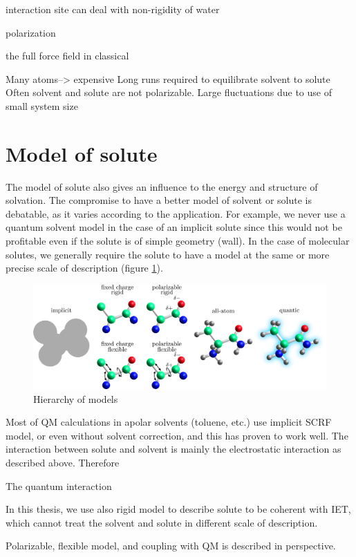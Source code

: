 interaction site can deal with non-rigidity of water

polarization

the full force field in classical

Many atoms--> expensive Long runs required to equilibrate solvent
to solute Often solvent and solute are not polarizable. Large fluctuations
due to use of small system size 


\section{Model of solute}

The model of solute also gives an influence to the energy and structure
of solvation. The compromise to have a better model of solvent or
solute is debatable, as it varies according to the application. For
example, we never use a quantum solvent model in the case of an implicit
solute since this would not be profitable even if the solute is of simple geometry
(wall). In the case of molecular solutes, we generally require the
solute to have a model at the same  or more precise scale of description
(figure \ref{fig:Hierarchy-of-models}).

\begin{flushright}
\begin{figure}[h]
\raggedleft{}%
\begin{minipage}[t]{1.1\columnwidth}%
\begin{center}
\includegraphics[width=1\columnwidth]{_figure/solute}
\par\end{center}%
\end{minipage}\caption{Hierarchy of models\label{fig:Hierarchy-of-models}}
\end{figure}

\par\end{flushright}

Most of \acs{QM} calculations in apolar solvents (toluene, etc.)
use implicit SCRF model, or even without solvent correction, and
this has proven to work well. The interaction between solute and
solvent is mainly the electrostatic interaction as described above.
Therefore 

The quantum interaction 

In this thesis, we use also rigid model to describe solute to be coherent
with IET, which cannot treat the solvent and solute in different scale
of description. 

Polarizable, flexible model, and coupling with QM is described in
perspective.

